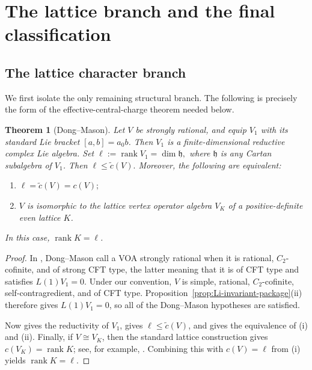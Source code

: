 \documentclass[12pt,leqno]{amsart}
\numberwithin{equation}{section} \newtheorem{thm}{Theorem}[section] \newtheorem{lem}[thm]{Lemma} \newtheorem{ex}[thm]{Example} \newtheorem{prop}[thm]{Proposition} \newtheorem{cor}[thm]{Corollary} \newtheorem{defi}[thm]{Definition} \newtheorem{rmk}[thm]{Remark} \newtheorem{notation}[thm]{Notation}
\begin{document}
\section{The lattice branch and the final classification}\label{sec:final}

\subsection{The lattice character branch}

We first isolate the only remaining structural branch. The following is precisely the form of the effective-central-charge theorem needed below.

\begin{thm}[Dong--Mason]\label{thm:DM-rank}
Let $V$ be strongly rational, and equip $V_1$ with its standard Lie bracket \([a,b]=a_0b\). Then $V_1$ is a finite-dimensional reductive complex Lie algebra. Set \(\ell:=\operatorname{rank}V_1=\dim\mathfrak h,\) where $\mathfrak h$ is any Cartan subalgebra of $V_1$. Then \(\ell\leq\widetilde c(V).\) Moreover, the following are equivalent:
\begin{enumerate}[label=\textnormal{(\roman*)}]
\item \(\ell=\widetilde c(V)=c(V);\)
\item $V$ is isomorphic to the lattice vertex operator algebra $V_K$ of a
positive-definite even lattice $K$.
\end{enumerate}
In this case, \(\operatorname{rank}K=\ell\).
\end{thm}

\begin{proof}
In \cite[Section~3]{DM}, Dong--Mason call a VOA strongly rational when it is rational, $C_2$-cofinite, and of strong CFT type, the latter meaning that it is of CFT type and satisfies $L(1)V_1=0$. Under our convention, $V$ is simple, rational, $C_2$-cofinite, self-contragredient, and of CFT type. Proposition~\ref{prop:Li-invariant-package}(ii) therefore gives \(L(1)V_1=0\), so all of the Dong--Mason hypotheses are satisfied.

Now \cite[Theorem~1]{DM} gives the reductivity of $V_1$, \cite[Theorem~2]{DM} gives \(\ell\leq\widetilde c(V)\), and \cite[Theorem~3]{DM} gives the equivalence of \textnormal{(i)} and \textnormal{(ii)}. Finally, if \(V\cong V_K\), then the standard lattice construction gives \(c(V_K)=\operatorname{rank}K\); see, for example, \cite[Chapter~8]{FLM}. Combining this with \(c(V)=\ell\) from \textnormal{(i)} yields \(\operatorname{rank}K=\ell\).
\end{proof}
\end{document}
